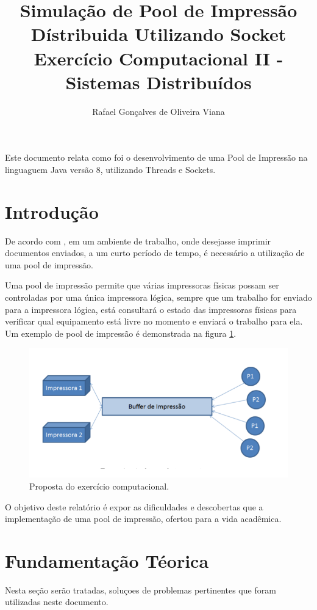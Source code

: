 \documentclass[12pt]{article}
\title{ Simulação de Pool de Impressão Dístribuida Utilizando Socket \\ Exercício Computacional II - Sistemas Distribuídos}
\author{Rafael Gonçalves de Oliveira Viana\inst{1}  }
\begin{document}
 

\maketitle

     
\begin{resumo} 	
  Este  documento relata como foi o desenvolvimento de uma Pool de Impressão na linguaguem Java versão 8, utilizando Threads e Sockets.
\end{resumo}

\section{Introdução}
De acordo com \cite{entf}, em um ambiente de trabalho, onde desejasse imprimir documentos enviados, a um curto período de tempo, é necessário a utilização de uma pool de impressão.

Uma pool de impressão permite que várias impressoras físicas possam ser controladas por uma única impressora lógica,  sempre que um trabalho for enviado para a impressora lógica, está consultará o estado das impressoras físicas para verificar qual equipamento está livre no momento e enviará o trabalho para ela.
 Um exemplo de pool de impressão é demonstrada na figura \ref{fig:screenshot001}.

\begin{figure}[H]
 	\centering
 	\includegraphics[width=0.7\linewidth]{imagens/proposta}
 	\caption{Proposta do exercício computacional.}
 	\label{fig:screenshot001}
 \end{figure}
 
 O objetivo deste relatório é expor as dificuldades e descobertas que a implementação de uma pool de impressão, ofertou para a vida acadêmica.

\section{Fundamentação Téorica} 
	Nesta seção serão tratadas, soluçoes de problemas pertinentes que foram utilizadas neste documento.
\end{document}
